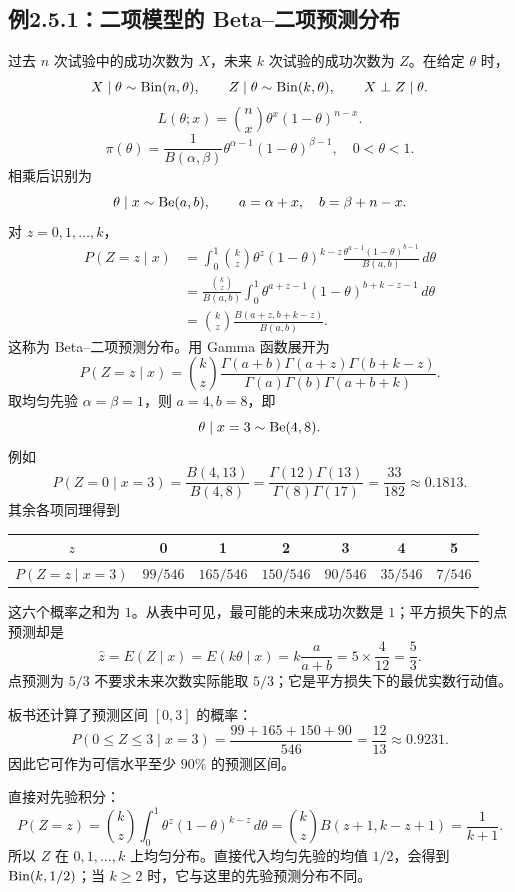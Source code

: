 \subsection{例2.5.1：二项模型的 Beta--二项预测分布}
过去 $n$ 次试验中的成功次数为 $X$，未来 $k$ 次试验的成功次数为 $Z$。在给定 $\theta$ 时，
\[
X\mid\theta\sim\operatorname{Bin}(n,\theta),\qquad
Z\mid\theta\sim\operatorname{Bin}(k,\theta),\qquad X\perp Z\mid\theta.
\]
\[
L(\theta;x)=\binom nx\theta^x(1-\theta)^{n-x}.
\]
\[
\pi(\theta)=\frac1{B(\alpha,\beta)}
\theta^{\alpha-1}(1-\theta)^{\beta-1},\quad0<\theta<1.
\]
相乘后识别为
\[
\theta\mid x\sim\operatorname{Be}(a,b),\qquad a=\alpha+x,\quad b=\beta+n-x.
\]
对 $z=0,1,\ldots,k$，
\begin{align*}
P(Z=z\mid x)
&=\int_0^1\binom kz\theta^z(1-\theta)^{k-z}
\frac{\theta^{a-1}(1-\theta)^{b-1}}{B(a,b)}\,d\theta\\
&=\frac{\binom kz}{B(a,b)}
\int_0^1\theta^{a+z-1}(1-\theta)^{b+k-z-1}\,d\theta\\
&=\boxed{\binom kz\frac{B(a+z,b+k-z)}{B(a,b)}}.
\end{align*}
这称为 Beta--二项预测分布。用 Gamma 函数展开为
\[
P(Z=z\mid x)=\binom kz
\frac{\Gamma(a+b)\Gamma(a+z)\Gamma(b+k-z)}
{\Gamma(a)\Gamma(b)\Gamma(a+b+k)}.
\]
取均匀先验 $\alpha=\beta=1$，则 $a=4,b=8$，即
\[
\theta\mid x=3\sim\operatorname{Be}(4,8).
\]
例如
\[
P(Z=0\mid x=3)=\frac{B(4,13)}{B(4,8)}
=\frac{\Gamma(12)\Gamma(13)}{\Gamma(8)\Gamma(17)}
=\frac{33}{182}\approx0.1813.
\]
其余各项同理得到
\begin{center}
\begin{tabular}{c*{6}{c}}
\toprule
$z$&0&1&2&3&4&5\\
\midrule
$P(Z=z\mid x=3)$&$99/546$&$165/546$&$150/546$&$90/546$&$35/546$&$7/546$\\
\bottomrule
\end{tabular}
\end{center}
这六个概率之和为 $1$。从表中可见，最可能的未来成功次数是 $1$；平方损失下的点预测却是
\[
\hat z=E(Z\mid x)=E(k\theta\mid x)
=k\frac a{a+b}=5\times\frac4{12}=\frac53.
\]
点预测为 $5/3$ 不要求未来次数实际能取 $5/3$；它是平方损失下的最优实数行动值。

板书还计算了预测区间 $[0,3]$ 的概率：
\[
P(0\leq Z\leq3\mid x=3)
=\frac{99+165+150+90}{546}=\frac{12}{13}\approx0.9231.
\]
因此它可作为可信水平至少 $90\%$ 的预测区间。

直接对先验积分：
\[
P(Z=z)=\binom kz\int_0^1\theta^z(1-\theta)^{k-z}\,d\theta
=\binom kz B(z+1,k-z+1)=\frac1{k+1}.
\]
所以 $Z$ 在 $0,1,\ldots,k$ 上均匀分布。直接代入均匀先验的均值 $1/2$，会得到 $\operatorname{Bin}(k,1/2)$；当 $k\geq2$ 时，它与这里的先验预测分布不同。

